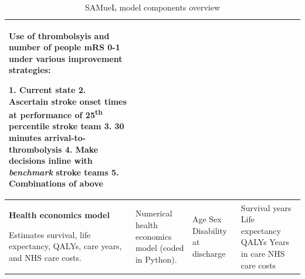 \begin{landscape}
{\begin{table}
\begin{tabular}{|p{5cm}|p{5cm}|p{6cm}|p{6cm}|}
Use of thrombolsyis and number of people mRS 0-1 under various improvement strategies:\newline\vspace{4pt}

1. Current state\newline\vspace{2pt}
2. Ascertain stroke onset times at performance of 25\textsuperscript{th} percentile stroke team\newline\vspace{2pt}
3. 30 minutes arrival-to-thrombolysis\newline\vspace{2pt}
4. Make decisions inline with \textit{benchmark} stroke teams\newline\vspace{2pt}
5. Combinations of above\newline\vspace{2pt}\\

\hline


\textbf{Health economics model}

\vspace{3mm}

Estimates survival, life expectancy, QALYs, care years, and NHS care costs. &

Numerical health economics model (coded in Python). &

Age\newline\vspace{2pt}
Sex\newline\vspace{2pt}
Disability at discharge &

Survival years\newline\vspace{2pt}
Life expectancy\newline\vspace{2pt}
QALYs\newline\vspace{2pt}
Years in care\newline\vspace{2pt}
NHS care costs\\





\hline


\end{tabular}
\caption{SAMueL model components overview}
\label{tab:example}
\end{table}
}
\end{landscape}